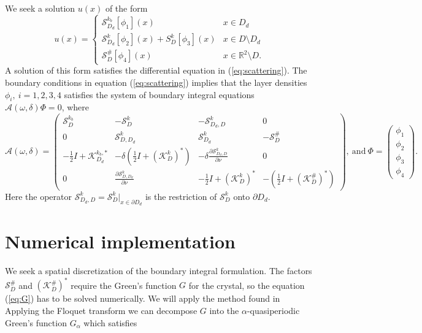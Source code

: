 \documentclass[a4paper]{article}
\theoremstyle{definition}
\newcommand{\R}{\mathbb{R}}
\newcommand{\A}{\mathcal{A}}
\newcommand{\Scrystal}{\mathcal{S}_D^\#}
\newcommand{\KstarC}{(\mathcal{K}_D^{\#})^*}
\newcommand{\eqnref}[1]{(\ref {#1})}
\begin{document}
We seek a solution $u(x)$ of the form
\begin{equation*}
u(x) = \begin{cases}
\mathcal{S}_{D_d}^{k_b}[\phi_1](x) \quad &x\in D_d \\
\mathcal{S}_{D_d}^{k}[\phi_2](x) + S_D^k[\phi_3](x) & x\in D\setminus D_d \\
\Scrystal[\phi_4](x) & x \in \R^2\setminus D.
\end{cases}
\end{equation*}
A solution of this form satisfies the differential equation in \eqnref{eq:scattering}. The boundary conditions in equation \eqnref{eq:scattering} implies that the layer densities $\phi_i,\ i=1,2,3,4$ satisfies the system of boundary integral equations $\A(\omega, \delta)\Phi = 0$, where
\begin{equation*}
\A(\omega, \delta) = 
\begin{pmatrix}
\mathcal{S}_D^{k_b} &  -\mathcal{S}_D^{k} & -\mathcal{S}_{D_d,D}^{k} & 0 \\
0 & \mathcal{S}_{D,D_d}^k & \mathcal{S}_{D_d}^k & -\Scrystal \\
-\frac{1}{2}I+ \mathcal{K}_{D_d}^{k_b, *}& -\delta\left( \frac{1}{2}I+ (\mathcal{K}_D^{k})^*\right) & -\delta \frac{\partial \mathcal{S}_{D_d,D}^{k}}{\partial \nu} & 0 \\
0 & \frac{\partial \mathcal{S}_{D,D_d}^{k}}{\partial \nu} & -\frac{1}{2}I+ (\mathcal{K}_D^{k})^* & -\left( \frac{1}{2}I+ \KstarC\right)
\end{pmatrix}, 
\ \text{and}  \ \Phi= 
\begin{pmatrix}
\phi_1\\
\phi_2 \\
\phi_3 \\
\phi_4
\end{pmatrix}.
\end{equation*}
Here the operator $\mathcal{S}_{D_d,D}^{k} = \mathcal{S}_{D}^{k}|_{x\in \partial D_d}$ is the restriction of $\mathcal{S}_{D}^{k}$ onto $\partial D_d$.

\section{Numerical implementation}
We seek a spatial discretization of the boundary integral formulation. The factors $\Scrystal$ and $\KstarC$ require the Green's function $G$ for the crystal, so the equation \eqnref{eq:G} has to be solved numerically. We will apply the method found in \cite{bandgap}
Applying the Floquet transform we can decompose $G$ into the $\alpha$-quasiperiodic Green's function $G_\alpha$ which satisfies
\end{document}

